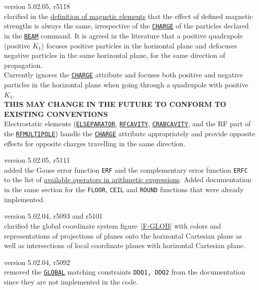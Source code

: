\begin{madlist}
   version 5.02.05, r5118\\
  clarified in the \hyperref[chap:elements]{definition of magnetic elements} 
  that the effect of defined magnetic strengths is always the same, 
  irrespective of the \hyperref[sec:beam]{\texttt{CHARGE}} of the particles declared 
  in the \hyperref[sec:beam]{\texttt{BEAM}} command. It is agreed in the literature 
  that a positive quadrupole (positive $K_1$) focuses positive particles in the 
  horizontal plane and defocuses negative particles in the same horizontal 
  plane, for the same direction of propagation. \\ 
  Currently \mad ignores the \hyperref[sec:beam]{\texttt{CHARGE}} attribute and 
  focuses both positive and negative particles in the horizontal plane when 
  going through a quadrupole with positive $K_1$. \\
  \textbf{THIS MAY CHANGE IN THE FUTURE TO CONFORM TO EXISTING CONVENTIONS}\\
  Electrostatic elements (\hyperref[sec:elseparator]{\texttt{ELSEPARATOR}}, 
  \hyperref[sec:rfcavity]{\texttt{RFCAVITY}},
  \hyperref[sec:crabcavity]{\texttt{CRABCAVITY}}, and the RF part of the
  \hyperref[sec:rfmultipole]{\texttt{RFMULTIPOLE}}) handle the
  \hyperref[sec:beam]{\texttt{CHARGE}} attribute appropriately and provide 
  opposite effects for opposite charges travelling in the same direction. 


   version 5.02.05, r5111\\
  added the Gauss error function \texttt{ERF} and the complementary error function 
  \texttt{ERFC} to the list of \hyperref[subsec:operator]{available operators in 
  arithmetic expressions}. Added documentation in the same section for the 
  \texttt{FLOOR}, \texttt{CEIL} and \texttt{ROUND} functions that were already 
  implemented. 
  
  
   version 5.02.04, r5093 and r5101\\
  clarified the global coordinate system figure~\ref{F-GLOB} with colors and 
  representations of projections of planes onto the horizontal Cartesian 
  plane as well as intersections of local coordinate planes with horizontal 
  Cartesian plane. 
  
  
   version 5.02.04, r5092\\
  removed the \hyperref[sec:global]{\texttt{GLOBAL}} matching constraints
  \texttt{DDQ1, DDQ2} from the documentation since they are not
  implemented in the code.  
  

\end{madlist}
